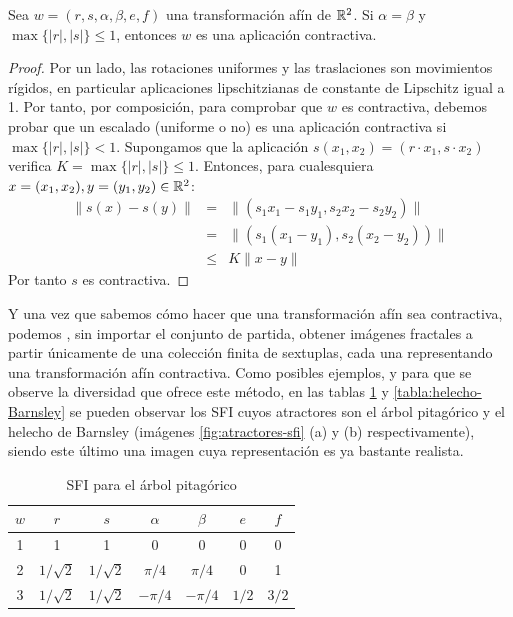 \begin{proposicion}
    Sea $w =(r,s,\alpha,\beta,e,f)$ una transformación afín de $\mathbb{R}^2$. Si $\alpha=\beta$ y $\max\{|r|,|s|\}\leq 1$, entonces $w$ es una aplicación contractiva. 
\end{proposicion}
\begin{proof}
    Por un lado, las rotaciones uniformes y las traslaciones son movimientos rígidos, en particular aplicaciones lipschitzianas de constante de Lipschitz igual a 1. Por tanto, por composición, para comprobar que $w$ es contractiva, debemos probar que un escalado (uniforme o no) es una aplicación contractiva si $\max\{|r|,|s|\}<1$. Supongamos que la aplicación $s(x_1,x_2)=(r\cdot x_1,s\cdot x_2)$ verifica $K=\max\{|r|,|s|\}\leq 1$. Entonces, para cualesquiera $x=(x_1,x_2), y=(y_1,y_2)\in\mathbb{R}^2$:
    \begin{eqnarray*}
        \|s(x) - s(y)\| & = & \|(s_1 x_1-s_1 y_1, s_2 x_2 - s_2 y_2)\| \\
                        & = & \|(s_1(x_1-y_1), s_2(x_2-y_2))\| \\
                        & \leq & K \|x-y\|
    \end{eqnarray*}
    Por tanto $s$ es contractiva.
\end{proof}

Y una vez que sabemos cómo hacer que una transformación afín sea contractiva, podemos , sin importar el conjunto de partida, obtener imágenes fractales a partir únicamente de una colección finita de sextuplas, cada una representando una transformación afín contractiva. Como posibles ejemplos, y para que se observe la diversidad que ofrece este método, en las tablas \ref{tabla:arbol-pitagoras} y \ref{tabla:helecho-Barnsley} se pueden observar los SFI cuyos atractores son el árbol pitagórico y el helecho de Barnsley (imágenes \ref{fig:atractores-sfi} (a) y (b) respectivamente), siendo este último una imagen cuya representación es ya bastante realista.

\newpage
\begin{table}
    \centering
    \begin{tabular}{c|cccccc} \hline
        $w$ & $r$ & $s$ & $\alpha$ & $\beta$ & $e$ & $f$ \\ \hline\hline
    1 & 1 & 1 & 0 & 0 & 0 & 0 \\ \hline
    2 & $1/\sqrt 2$ & $1/\sqrt 2$ & $\pi/4$ & $\pi/4$ & 0 & 1 \\ \hline
    3 & $1/\sqrt 2$ & $1/\sqrt 2$ & $-\pi/4$ & $-\pi/4$ & $1/2$ &  $3/2$ \\ \hline
    \end{tabular}
    \caption{SFI para el árbol pitagórico}
    \label{tabla:arbol-pitagoras}
\end{table}

